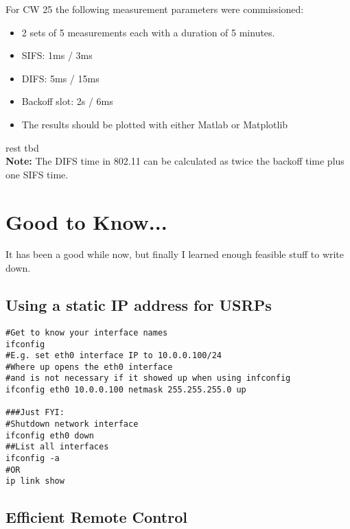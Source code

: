 \documentclass{article}
\begin{document}
For CW 25 the following measurement parameters were commissioned:

\begin{itemize}
	\item 2 sets of 5 measurements each with a duration of 5 minutes.
	\item SIFS: 1ms / 3ms 
	\item DIFS: 5ms  / 15ms 
	\item Backoff slot: 2s / 6ms
	\item The results should be plotted with either Matlab or Matplotlib
\end{itemize}

rest tbd \\

\textbf{Note:} The DIFS time in 802.11 can be calculated as twice the backoff time plus one SIFS time.



\section{Good to Know...}

It has been a good while now, but finally I learned enough feasible stuff to write down.

\subsection{Using a static IP address for USRPs}
\begin{verbatim}
#Get to know your interface names
ifconfig 
#E.g. set eth0 interface IP to 10.0.0.100/24
#Where up opens the eth0 interface 
#and is not necessary if it showed up when using infconfig
ifconfig eth0 10.0.0.100 netmask 255.255.255.0 up

###Just FYI:
#Shutdown network interface
ifconfig eth0 down
##List all interfaces
ifconfig -a
#OR
ip link show
\end{verbatim}

\subsection{Efficient Remote Control}
\end{document}
